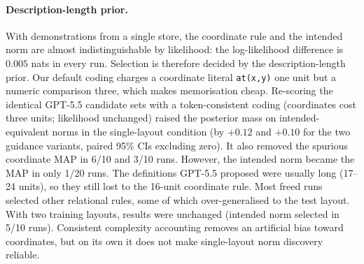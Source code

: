 \paragraph{Description-length prior.} With demonstrations from a single store, the coordinate rule and the intended
norm are almost indistinguishable by likelihood: the log-likelihood difference is $0.005$ nats in every run. Selection
is therefore decided by the description-length prior. Our default coding charges a coordinate literal
\texttt{at(x,y)} one unit but a numeric comparison three, which makes memorisation cheap. Re-scoring the identical
GPT-5.5 candidate sets with a token-consistent coding (coordinates cost three units; likelihood unchanged) raised the
posterior mass on intended-equivalent norms in the single-layout condition (by $+0.12$ and $+0.10$ for the two guidance
variants, paired 95\% CIs excluding zero). It also removed the spurious coordinate MAP in 6/10 and 3/10 runs. However,
the intended norm became the MAP in only 1/20 runs. The definitions GPT-5.5 proposed were usually long (17--24 units),
so they still lost to the 16-unit coordinate rule. Most freed runs selected other relational rules, some of which
over-generalised to the test layout. With two training layouts, results were unchanged (intended norm selected in
5/10 runs). Consistent complexity accounting removes an artificial bias toward coordinates, but on its own it does not
make single-layout norm discovery reliable.
